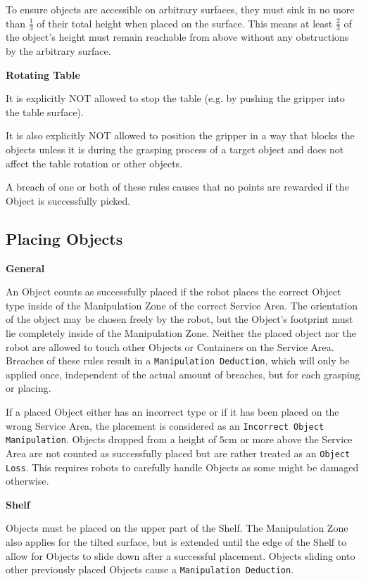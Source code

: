 To ensure objects are accessible on arbitrary surfaces, they must sink in no more than $\frac{1}{3}$ of their total height when placed on the surface. This means at least $\frac{2}{3}$  of the object's height must remain reachable from above without any obstructions by the arbitrary surface.


\textbf{Rotating Table}

It is explicitly NOT allowed to stop the table (e.g. by pushing the gripper into the table surface).

It is also explicitly NOT allowed to position the gripper in a way that blocks the objects 
unless it is during the grasping process of a target object and does not affect the table rotation or other objects.

A breach of one or both of these rules causes that no points are rewarded if the Object is successfully picked.

\subsection{Placing Objects} \label{ssec:PlacingObjects}

\textbf{General}

An Object counts as successfully placed if the robot places the correct Object type inside of the Manipulation Zone of the correct Service Area. The orientation of the object may be chosen freely by the robot, but the Object's footprint must lie completely inside of the Manipulation Zone.
Neither the placed object nor the robot are allowed to touch other Objects or Containers on the Service Area.
Breaches of these rules result in a \texttt{Manipulation Deduction}, which will only be applied once, independent of the actual amount of breaches, but for each grasping or placing.

If a placed Object either has an incorrect type or if it has been placed on the wrong Service Area, 
the placement is considered as an \texttt{Incorrect Object Manipulation}. 
Objects dropped from a height of $5\si{\centi\meter}$ or more above the Service Area are not counted as successfully placed but are rather treated as an \texttt{Object Loss}. This requires robots to carefully handle Objects as some might be damaged otherwise.


\textbf{Shelf}

Objects must be placed on the upper part of the Shelf.
The Manipulation Zone also applies for the tilted surface, but is extended until the edge of the Shelf to allow for Objects to slide down after a successful placement. Objects sliding onto other previously placed Objects cause a \texttt{Manipulation Deduction}.


